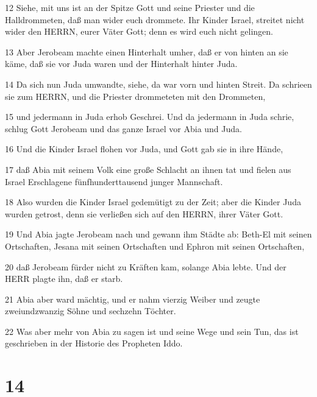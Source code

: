 \par 12 Siehe, mit uns ist an der Spitze Gott und seine Priester und die Halldrommeten, daß man wider euch drommete. Ihr Kinder Israel, streitet nicht wider den HERRN, eurer Väter Gott; denn es wird euch nicht gelingen.
\par 13 Aber Jerobeam machte einen Hinterhalt umher, daß er von hinten an sie käme, daß sie vor Juda waren und der Hinterhalt hinter Juda.
\par 14 Da sich nun Juda umwandte, siehe, da war vorn und hinten Streit. Da schrieen sie zum HERRN, und die Priester drommeteten mit den Drommeten,
\par 15 und jedermann in Juda erhob Geschrei. Und da jedermann in Juda schrie, schlug Gott Jerobeam und das ganze Israel vor Abia und Juda.
\par 16 Und die Kinder Israel flohen vor Juda, und Gott gab sie in ihre Hände,
\par 17 daß Abia mit seinem Volk eine große Schlacht an ihnen tat und fielen aus Israel Erschlagene fünfhunderttausend junger Mannschaft.
\par 18 Also wurden die Kinder Israel gedemütigt zu der Zeit; aber die Kinder Juda wurden getrost, denn sie verließen sich auf den HERRN, ihrer Väter Gott.
\par 19 Und Abia jagte Jerobeam nach und gewann ihm Städte ab: Beth-El mit seinen Ortschaften, Jesana mit seinen Ortschaften und Ephron mit seinen Ortschaften,
\par 20 daß Jerobeam fürder nicht zu Kräften kam, solange Abia lebte. Und der HERR plagte ihn, daß er starb.
\par 21 Abia aber ward mächtig, und er nahm vierzig Weiber und zeugte zweiundzwanzig Söhne und sechzehn Töchter.
\par 22 Was aber mehr von Abia zu sagen ist und seine Wege und sein Tun, das ist geschrieben in der Historie des Propheten Iddo.

\chapter{14}

